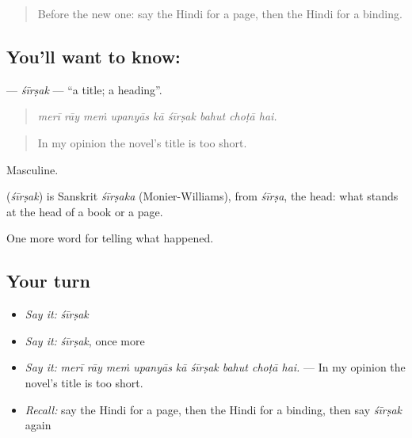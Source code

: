 \begin{quote}
Before the new one: say the Hindi for a page, then the Hindi for a binding.
\end{quote}

\subsection*{You'll want to know: }
\textbf{} — \emph{śīrṣak} — \textquotedblleft{}a title; a heading\textquotedblright{}.

\begin{quote}
        
\end{quote}

\begin{quote}
\emph{merī rāy meṁ upanyās kā śīrṣak bahut choṭā hai.}
\end{quote}

\begin{quote}
In my opinion the novel's title is too short.
\end{quote}

Masculine.

\begin{cousinweb}
\textbf{} (\emph{śīrṣak}) is Sanskrit \emph{śīrṣaka} (Monier-Williams), from \emph{śīrṣa}, the head: what stands at the head of a book or a page.
\end{cousinweb}

\begin{grammarlens}[title={What you've built}]
One more word for telling what happened.
\end{grammarlens}

\subsection*{Your turn}
\begin{itemize}
\raggedright
  \item \emph{Say it:} \emph{śīrṣak}
  \item \emph{Say it:} \emph{śīrṣak}, once more
  \item \emph{Say it:} \emph{merī rāy meṁ upanyās kā śīrṣak bahut choṭā hai.} — In my opinion the novel's title is too short.
  \item \emph{Recall:} say the Hindi for a page, then the Hindi for a binding, then say \emph{śīrṣak} again
\end{itemize}

